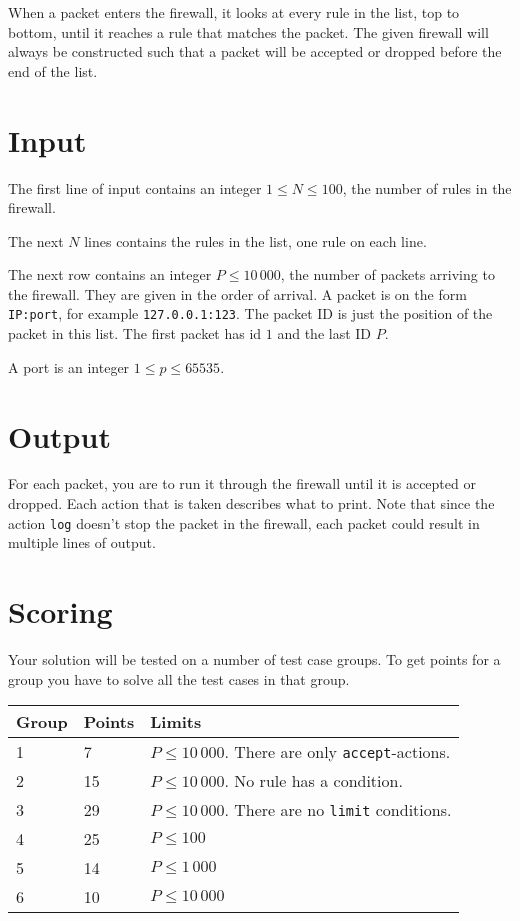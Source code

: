 When a packet enters the firewall, it looks at every rule in the list, top to bottom, until it reaches a rule that matches the packet. The given firewall will always be constructed such that a packet will be accepted or dropped before the end of the list.

\section*{Input}
The first line of input contains an integer $1 \le N \le 100$, the number of rules in the firewall.

The next $N$ lines contains the rules in the list, one rule on each line.

The next row contains an integer $P \le 10\,000$, the number of packets arriving to the firewall. They are given in the order of arrival.
A packet is on the form \texttt{IP:port}, for example \texttt{127.0.0.1:123}. The packet ID is just the position of the packet in this list. The first packet has id $1$ and the last ID $P$.

A port is an integer $1 \le p \le 65535$.

\section*{Output}
For each packet, you are to run it through the firewall until it is accepted or dropped. Each action that is taken describes what to print. Note that since the
action \texttt{log} doesn't stop the packet in the firewall, each packet could result in multiple lines of output.


\section*{Scoring}
Your solution will be tested on a number of test case groups. To get points for a group
you have to solve all the test cases in that group.

\begin{tabular}{| l | l | l |}
	\hline
	Group & Points & Limits\\ \hline
	1     & 7          & $P \le 10\,000$. There are only \texttt{accept}-actions.  \\ \hline
	2     & 15         & $P \le 10\,000$. No rule has a condition. \\ \hline
	3     & 29         & $P \le 10\,000$. There are no \texttt{limit} conditions. \\ \hline
	4     & 25         & $P \le 100$ \\ \hline
	5     & 14         & $P \le 1\,000$ \\ \hline
	6     & 10         & $P \le 10\,000$ \\ \hline
\end{tabular}
